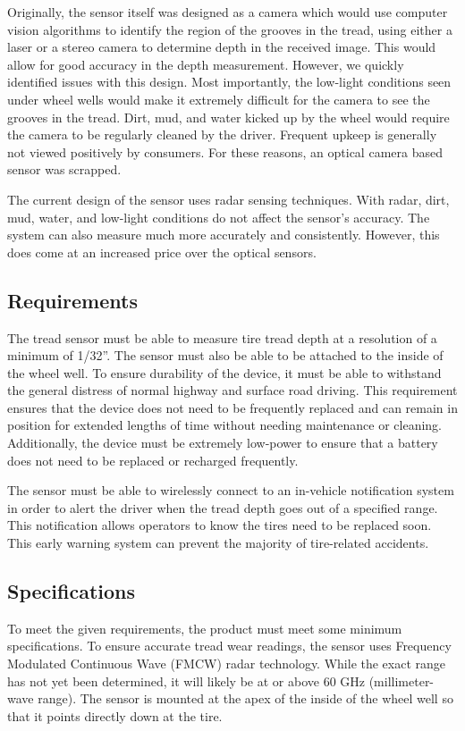 \documentclass[11pt]{IEEEtran}
\begin{document}
			Originally, the sensor itself was designed as a camera which would use computer vision algorithms to identify the region of the grooves in the tread, using either a laser or a stereo camera to determine depth in the received image. This would allow for good accuracy in the depth measurement. However, we quickly identified issues with this design. Most importantly, the low-light conditions seen under wheel wells would make it extremely difficult for the camera to see the grooves in the tread. Dirt, mud, and water kicked up by the wheel would require the camera to be regularly cleaned by the driver. Frequent upkeep is generally not viewed positively by consumers. For these reasons, an optical camera based sensor was scrapped.

			The current design of the sensor uses radar sensing techniques. With radar, dirt, mud, water, and low-light conditions do not affect the sensor's accuracy. The system can also measure much more accurately and consistently. However, this does come at an increased price over the optical sensors. 

		\subsection{Requirements}
			The tread sensor must be able to measure tire tread depth at a resolution of a minimum of 1/32''. The sensor must also be able to be attached to the inside of the wheel well. To ensure durability of the device, it must be able to withstand the general distress of normal highway and surface road driving. This requirement ensures that the device does not need to be frequently replaced and can remain in position for extended lengths of time without needing maintenance or cleaning. Additionally, the device must be extremely low-power to ensure that a battery does not need to be replaced or recharged frequently.

			The sensor must be able to wirelessly connect to an in-vehicle notification system in order to alert the driver when the tread depth goes out of a specified range. This notification allows operators to know the tires need to be replaced soon. This early warning system can prevent the majority of tire-related accidents.
 
		\subsection{Specifications}
			To meet the given requirements, the product must meet some minimum specifications. To ensure accurate tread wear readings, the sensor uses Frequency Modulated Continuous Wave (FMCW) radar technology. While the exact range has not yet been determined, it will likely be at or above 60 GHz (millimeter-wave range). The sensor is mounted at the apex of the inside of the wheel well so that it points directly down at the tire. 
\end{document}
